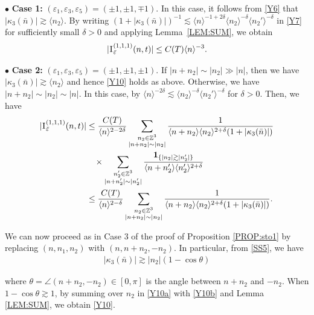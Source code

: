 \documentclass[%
11pt,  reqno]{amsart}
\newcommand{\1}{\hspace{0.2mm}\text{I}\hspace{0.2mm}}
\newcommand{\noi}{\noindent}
\newcommand{\Z}{\mathbb{Z}}
\newcommand{\dl}{\delta}
\newcommand{\eps}{\varepsilon}
\newcommand{\kk}{\kappa}
\newcommand{\ta}{\theta}
\newcommand{\les}{\lesssim}
\newcommand{\ges}{\gtrsim}
\newcommand{\jb}[1]
{\langle #1 \rangle}
\newcommand{\ind}{\mathbf 1}
\numberwithin{equation}{section}
\numberwithin{theorem}{section}
\begin{document}
\noi
$\bullet$ {\bf Case 1:}
 $(\eps_1, \eps_3, \eps_5) = (\pm 1, \pm 1, \mp1)$.
\quad  
In this case, it follows from \eqref{Y6} that  $|\kk_3(\bar n) |\ges \jb{n_2}$.
By writing $(1+ |\kk_3(\bar n)|)^{-1} \les \jb{n}^{-1+2\dl} \jb{n_2}^{-\dl}
\jb{n_2'}^{-\dl}$ in \eqref{Y7} for sufficiently small  $\dl > 0$ 
and applying Lemma~\ref{LEM:SUM}, 
we obtain
\begin{align}
|\1^{(1,1,1)}_{\bar \eps} (n,t)|
\le C(T) \jb{n}^{-3}.
\label{Y10}
\end{align}


\noi
$\bullet$ {\bf Case 2:} $(\eps_1, \eps_3, \eps_5) = (\pm 1, \pm 1, \pm1)$.
\quad 
If   $|n + n_2|\sim |n_2| \gg |n|$, 
then we have $|\kk_3(\bar n) |\ges \jb{n_2}$
and hence \eqref{Y10} holds as above.
Otherwise, we have 
$|n + n_2|\sim |n_2| \sim |n|$.
In this case, 
by  $\jb{n}^{-2\dl} \les \jb{n_2}^{-\dl}\jb{n_2'}^{-\dl}$
for $\dl > 0$.
Then, we have
\begin{align}
|\1^{(1,1,1)}_{\bar \eps} (n,t)|
& \le \frac{C(T)}{\jb{n}^{2-2\dl}}
\sum_{\substack{n_2 \in \Z^3\\|n + n_2| \sim |n_2|}} 
\frac{1}
{ \jb{n+n_2} \jb{n_2}^{2+\dl} (1+ |\kk_3(\bar n)|)} \notag \\
& \hphantom{X}
\times
\sum_{\substack{n'_2 \in \Z^3\\|n + n'_2| \sim |n'_2|}}
\frac{\ind_{\{|n_2| \ges |n_2'|\}}}
{ \jb{n+n_2'} \jb{n_2'}^{2+\dl}}  \notag \\
& \le \frac{C(T)}{\jb{n}^{2-\dl}}
\sum_{\substack{n_2 \in \Z^3\\|n + n_2| \sim |n_2|}} 
\frac{1}
{ \jb{n+n_2} \jb{n_2}^{2+\dl} (1+ |\kk_3(\bar n)|)}.
\label{Y10a}
\end{align}



\noi
We can now proceed as in Case 3 of the proof of Proposition \ref{PROP:sto1}
by replacing $(n, n_1, n_2)$ with $(n, n+n_2, -n_2)$.
In particular, from \eqref{SS5}, we have 
\begin{align}
|\kk_3(\bar n)| 
\ges
 |n_2| (1 - \cos \theta)
\label{Y10b}
\end{align}

\noi
where $\ta = \angle(n + n_2, - n_2) \in [0, \pi]$ is the angle between $n + n_2$ and $-n_2$.
When  $1 - \cos \ta \ges 1$, 
by summing over $n_2$ in \eqref{Y10a}
with \eqref{Y10b} and Lemma \ref{LEM:SUM}, 
we obtain \eqref{Y10}.
\end{document}
